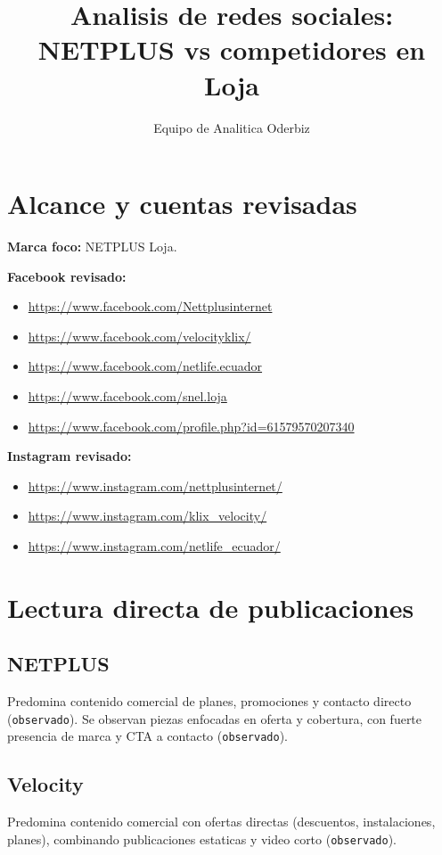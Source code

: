 \documentclass[9pt,a4paper,twocolumn,twoside]{tau-class/tau}
\title{Analisis de redes sociales: NETPLUS vs competidores en Loja}
\author[a,1]{Equipo de Analitica Oderbiz}
\affil[a]{Unidad de Inteligencia Comercial}
\begin{document}
\maketitle
\thispagestyle{firststyle}

\section{Alcance y cuentas revisadas}
\textbf{Marca foco:} NETPLUS Loja.

\textbf{Facebook revisado:}
\begin{itemize}
  \item \url{https://www.facebook.com/Nettplusinternet}
  \item \url{https://www.facebook.com/velocityklix/}
  \item \url{https://www.facebook.com/netlife.ecuador}
  \item \url{https://www.facebook.com/snel.loja}
  \item \url{https://www.facebook.com/profile.php?id=61579570207340}
\end{itemize}

\textbf{Instagram revisado:}
\begin{itemize}
  \item \url{https://www.instagram.com/nettplusinternet/}
  \item \url{https://www.instagram.com/klix_velocity/}
  \item \url{https://www.instagram.com/netlife_ecuador/}
\end{itemize}

\section{Lectura directa de publicaciones}
\subsection{NETPLUS}
Predomina contenido comercial de planes, promociones y contacto directo (\texttt{observado}). Se observan piezas enfocadas en oferta y cobertura, con fuerte presencia de marca y CTA a contacto (\texttt{observado}).

\subsection{Velocity}
Predomina contenido comercial con ofertas directas (descuentos, instalaciones, planes), combinando publicaciones estaticas y video corto (\texttt{observado}).
\end{document}
